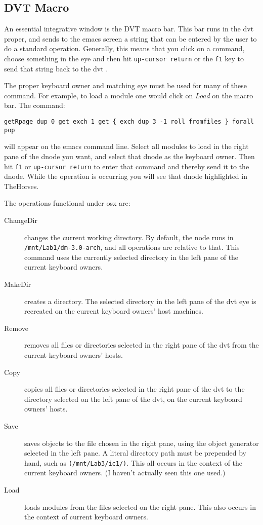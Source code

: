 \documentclass[12pt]{article}
\begin{document}
\subsection{DVT Macro}
\label{sec:macro}

An essential integrative window is the DVT macro bar. This bar runs in
the dvt proper, and sends to the emacs screen a string that can be
entered by the user to do a standard operation. Generally, this means
that you click on a command, choose something in the eye and then hit
\verb$up-cursor return$ or the \verb$f1$ key to send that string back
to the dvt \citep{dvt-emacs}.

The proper keyboard owner and matching eye must be used for many of
these command. For example, to load a module one would click on
\emph{Load} on the macro bar. The command:

\hspace{-0.6em}\verb$getRpage dup 0 get exch 1 get { exch dup 3 -1 roll fromfiles } forall pop$

will appear on the emacs command line. Select all modules to load in
the right pane of the dnode you want, and select that dnode as the
keyboard owner. Then hit \verb$f1$ or \verb$up-cursor return$ to enter
that command and thereby send it to the dnode. While the operation is
occurring you will see that dnode highlighted in TheHorses.

The operations functional under osx are:
\begin{description}
  \item[ChangeDir] changes the current working directory. By default,
  the node runs in \texttt{/mnt/Lab1/dm-3.0-arch}, and all operations
  are relative to that. This command uses the currently selected
  directory in the left pane of the current keyboard owners.
  \item[MakeDir] creates a directory. The selected directory in the
  left pane of the dvt eye is recreated on the current keyboard
  owners' host machines.
  \item[Remove] removes all files or directories selected in the right
  pane of the dvt from the current keyboard owners' hosts.
  \item[Copy] copies all files or directories selected in the right
  pane of the dvt to the directory selected on the left pane of the
  dvt, on the current keyboard owners' hosts.
  \item[Save] saves objects to the file chosen in the right pane,
  using the object generator selected in the left pane.  A literal
  directory path must be prepended by hand, such as
  \verb$(/mnt/Lab3/ic1/)$. This all occurs in the context of the
  current keyboard owners. (I haven't actually seen this one used.)
  \item[Load] loads modules from the files selected on the right
  pane. This also occurs in the context of current keyboard owners.
\end{description}
\end{document}
